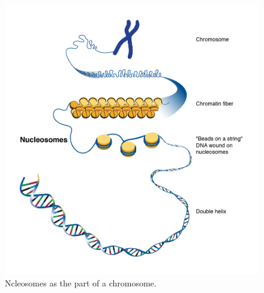 \begin{figure}[!ht]
	\centering
	\includegraphics[width=.9\textwidth]{figures/nucleosome1}
	\caption{Ncleosomes as the part of a chromosome.\label{o:latex_friendly_zone}}
\end{figure}

